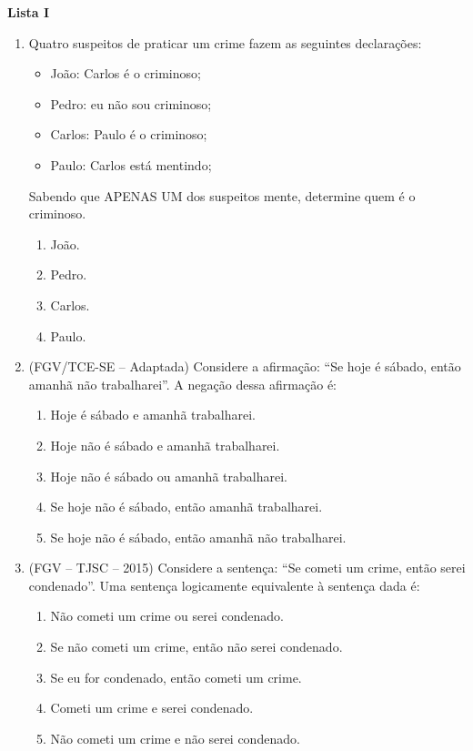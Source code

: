 \documentclass[12pt,a4paper]{article}
\begin{document}
\begin{center}
  \textbf{Lista I}
\end{center}

\begin{enumerate}
  \item Quatro suspeitos de praticar um crime fazem as seguintes declarações:
  
    \begin{itemize}
      \item João: Carlos é o criminoso;
      \item Pedro: eu não sou criminoso;
      \item Carlos: Paulo é o criminoso;
      \item Paulo: Carlos está mentindo;
    \end{itemize}

  Sabendo que APENAS UM dos suspeitos mente, determine quem é o criminoso.

    \begin{enumerate}
      \item João.
      \item Pedro.
      \item Carlos.
      \item Paulo.
    \end{enumerate}

  \item (FGV/TCE-SE -- Adaptada) Considere a afirmação: ``Se hoje é sábado, então amanhã não trabalharei''. 
  A negação dessa afirmação é:

    \begin{enumerate}
      \item Hoje é sábado e amanhã trabalharei.
      \item Hoje não é sábado e amanhã trabalharei.
      \item Hoje não é sábado ou amanhã trabalharei.
      \item Se hoje não é sábado, então amanhã trabalharei.
      \item Se hoje não é sábado, então amanhã não trabalharei.
    \end{enumerate}

  \item (FGV – TJSC – 2015) Considere a sentença: ``Se cometi um crime, então
    serei condenado''. Uma sentença logicamente equivalente à sentença dada é:

    \begin{enumerate}
      \item  Não cometi um crime ou serei condenado.
      \item  Se não cometi um crime, então não serei condenado.
      \item  Se eu for condenado, então cometi um crime.
      \item  Cometi um crime e serei condenado.
      \item  Não cometi um crime e não serei condenado.
    \end{enumerate}


\end{enumerate}
\end{document}
